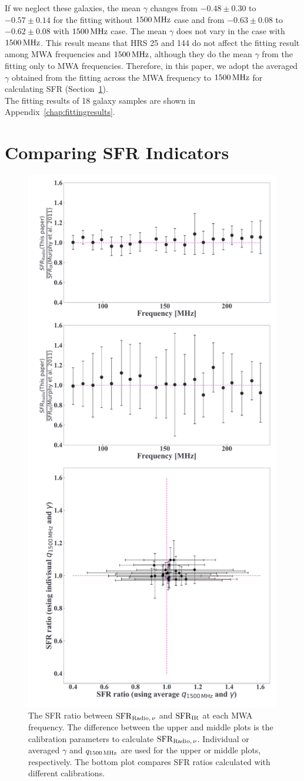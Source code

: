 If we neglect these galaxies, the mean $\gamma$ changes from $-0.48\pm0.30$ to $-0.57\pm0.14$ for the fitting without $1500\,\mathrm{MHz}$ case and from $-0.63\pm0.08$ to $-0.62\pm0.08$ with $1500\,\mathrm{MHz}$ case.
The mean $\gamma$ does not vary in the case with $1500\,\mathrm{MHz}$.
This result means that HRS 25 and 144 do not affect the fitting result among MWA frequencies and $1500\,\mathrm{MHz}$, although they do the mean $\gamma$ from the fitting only to MWA frequencies.
Therefore, in this paper, we adopt the averaged $\gamma$ obtained from the fitting across the MWA frequency to $1500\,\mathrm{MHz}$ for calculating SFR (Section~\ref{sec:sfrfromlowradio}).\\
The fitting results of 18 galaxy samples are shown in Appendix~\ref{chap:fittingresults}.



\section{Comparing SFR Indicators}\label{sec:sfrfromlowradio}

\begin{figure}[htbp]
	\centering
	\includegraphics[width=.6\linewidth]{Chapter_5/Figures/Result_sfrratio.pdf}
    \caption[The consistency of the radio SFR]{\label{fig:sfrratio}
        The SFR ratio between $\mathrm{SFR}_{\mathrm{Radio},\,\nu}$ and $\mathrm{SFR}_{\mathrm{IR}}$ at each MWA frequency.
        The difference between the upper and middle plots is the calibration parameters to calculate $\mathrm{SFR}_{\mathrm{Radio},\,\nu}$.
        Individual or averaged $\gamma$ and $q_{\mathrm{1500\,\mathrm{MHz}}}$ are used for the upper or middle plots, respectively.
    The bottom plot compares SFR ratios calculated with different calibrations.
    }
\end{figure}

